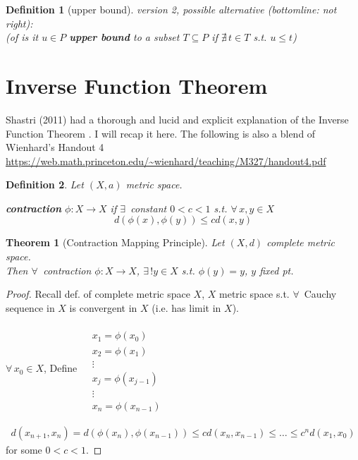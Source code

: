 \documentclass[10pt]{amsart}
\newtheorem{theorem}{Theorem}
\newtheorem{definition}{Definition}
\begin{document}
\begin{multicols*}{2}
\begin{definition}[upper bound]
version 2, possible alternative (bottomline: not right): \\
(of is it $u\in P$ \textbf{upper bound} to a subset $T \subseteq P$ if $\nexists \, t\in T$ s.t. $u\leq t$)

\end{definition}


\section{Inverse Function Theorem}

Shastri (2011) had a thorough and lucid and explicit explanation of the Inverse Function Theorem \cite{AShastri2011}.  I will recap it here.  The following is also a blend of Wienhard's Handout 4 \url{https://web.math.princeton.edu/~wienhard/teaching/M327/handout4.pdf}

\begin{definition}
  Let $(X,a)$ metric space.  

\textbf{contraction} $\phi:X \to X$ if $\exists \, $ constant $0<c<1$ s.t. $\forall \, x,y \in X$
\[
d(\phi(x),\phi(y)) \leq cd(x,y)
\]
\end{definition}

\begin{theorem}[Contraction Mapping Principle]
  Let $(X,d)$ complete metric space.  \\
Then $\forall \, $ contraction $\phi:X\to X$, $\exists \, ! y\in X$ s.t. $\phi(y) = y$, $y$ \emph{fixed pt.}
\end{theorem}

\begin{proof}
  Recall def. of complete metric space $X$, $X$ metric space s.t. $\forall \, $ Cauchy sequence in $X$ is convergent in $X$ (i.e. has limit in $X$).  

$\forall \, x_0 \in X$,
Define $\begin{aligned} & \quad \\
  & x_1 = \phi(x_0) \\ 
  & x_2 = \phi(x_1) \\ 
  & \vdots \\
  & x_j = \phi(x_{j-1}) \\ 
  & \vdots \\
  & x_n = \phi(x_{n-1})
\end{aligned}$

\[
\begin{gathered}
  d(x_{n+1},x_n) = d(\phi(x_n),\phi(x_{n-1})) \leq c d(x_n,x_{n-1}) \leq \dots \leq c^nd(x_1,x_0)
\end{gathered}
\]
for some $0< c<1$.


\end{proof}
\end{multicols*}
\end{document}
